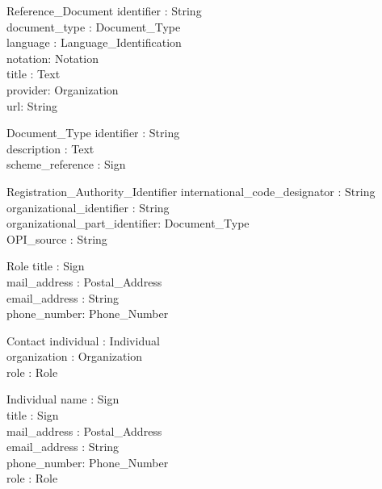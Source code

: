 \documentclass{llncs}
\begin{document}
\begin{class}{Reference\_Document}
\also
identifier : String \\
document\_type : Document\_Type \\
language : Language\_Identification \\
notation: Notation \\
title : Text\\
provider: Organization\\
url: String
\end{class}



\begin{class}{Document\_Type}
\also
identifier : String \\
description : Text \\
scheme\_reference : Sign \\
\end{class}

\begin{class}{Registration\_Authority\_Identifier}
\also
international\_code\_designator : String \\
organizational\_identifier : String \\
organizational\_part\_identifier: Document\_Type \\
OPI\_source : String \\
\end{class}

\begin{class}{Role}
\also
title : Sign \\
mail\_address : Postal\_Address \\
email\_address : String \\
phone\_number: Phone\_Number \\
\end{class}

\begin{class}{Contact}
\also
individual : Individual \\
organization : Organization \\
role : Role \\
\end{class}

\begin{class}{Individual}
\also
name : Sign \\
title : Sign \\
mail\_address : Postal\_Address \\
email\_address : String \\
phone\_number: Phone\_Number \\
role : Role \\
\end{class}
\end{document}
